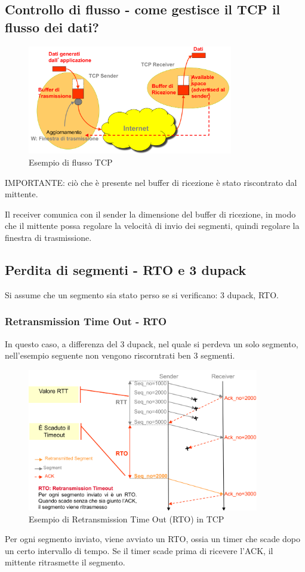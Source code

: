 \subsection{Controllo di flusso - come gestisce il TCP il flusso dei dati?}

\begin{figure}[h!]
    \centering
    \includegraphics[width=0.8\textwidth]{images/tcpflusso.png}
    \caption{Esempio di flusso TCP}
    \label{fig:tcpflusso}
\end{figure}


IMPORTANTE: ciò che è presente nel buffer di ricezione è stato riscontrato dal mittente.

Il receiver comunica con il sender la dimensione del buffer di ricezione, in modo che il mittente possa regolare la velocità di invio dei segmenti, quindi regolare la finestra di trasmissione.


\newpage
\subsection{Perdita di segmenti - RTO e 3 dupack} 
Si assume che un segmento sia stato perso se si verificano: 3 dupack, RTO.

 \subsubsection{Retransmission Time Out - RTO}
In questo caso, a differenza del 3 dupack, nel quale si perdeva un solo segmento, nell'esempio seguente non vengono riscorntrati ben 3 segmenti.

\begin{figure}[h!]
    \centering
    \includegraphics[width=0.9\textwidth]{images/rtotcp.png}
    \caption{Esempio di Retransmission Time Out (RTO) in TCP}
    \label{fig:rtotcp}
\end{figure}
Per ogni segmento inviato, viene avviato un RTO, ossia un timer che scade dopo un certo intervallo di tempo. Se il timer scade prima di ricevere l'ACK, il mittente ritrasmette il segmento.
